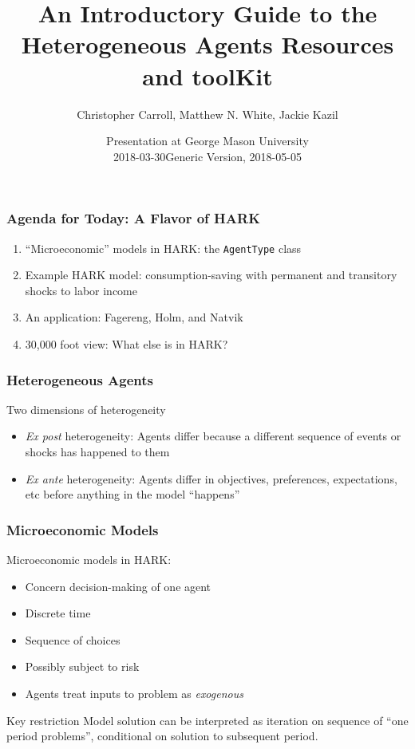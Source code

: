 \documentclass[11ptt]{beamer}
\author{Christopher Carroll, Matthew N. White, Jackie Kazil}
\title{An Introductory Guide to the \\ Heterogeneous Agents Resources and toolKit}
\date{Presentation at George Mason University \\ 2018-03-30}
\date{Generic Version, 2018-05-05} %
\newcommand{\bi}{\begin{itemize}}
\newcommand{\ei}{\end{itemize}}
\begin{document}
\begin{frame}
\maketitle
\end{frame}


\begin{frame}
\frametitle{Agenda for Today: A Flavor of HARK}
\begin{enumerate}
\item ``Microeconomic'' models in HARK: the \texttt{AgentType} class

\item Example HARK model: consumption-saving with permanent and transitory shocks to labor income

\item An application: Fagereng, Holm, and Natvik

\item 30,000 foot view: What else is in HARK?
\end{enumerate}
\end{frame}


\begin{frame}
\frametitle{Heterogeneous Agents}
\begin{block}{Two dimensions of heterogeneity}
\bi
\item \textit{Ex post} heterogeneity: Agents differ because a different sequence of events or shocks has happened to them

\item \textit{Ex ante} heterogeneity: Agents differ in objectives, preferences, expectations, etc before anything in the model ``happens''
\ei
\end{block}

\end{frame}


\begin{frame}
\frametitle{Microeconomic Models}
\begin{block}{Microeconomic models in HARK:}
\bi
\item Concern decision-making of one agent

\item Discrete time

\item Sequence of choices

\item Possibly subject to risk

\item Agents treat inputs to problem as \textit{exogenous}
\ei
\end{block}

\begin{block}{Key restriction}
Model solution can be interpreted as iteration on sequence of ``one period problems'', conditional on solution to subsequent period.
\end{block}
\end{frame}
\end{document}
